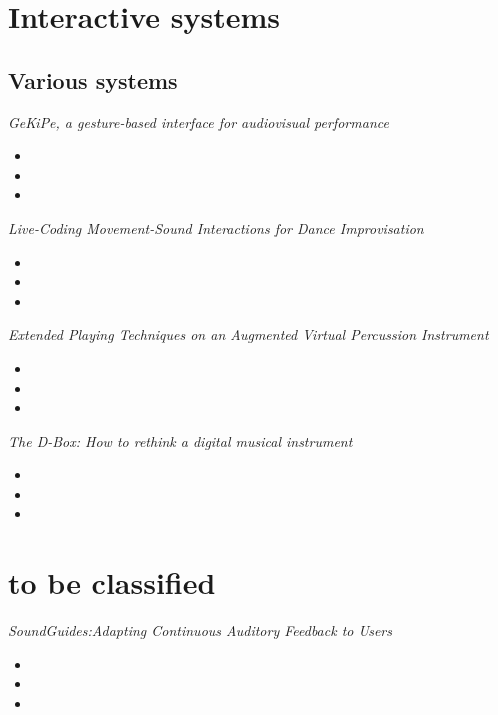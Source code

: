 \documentclass[11pt]{article}
\begin{document}
\section{Interactive systems}

\subsection{Various systems}

\textit{GeKiPe, a gesture-based interface for audiovisual performance} \citep{gekipe} 
\begin{itemize}
    \item 
    \item 
    \item 
\end{itemize}

\textit{Live-Coding Movement-Sound Interactions for Dance Improvisation} \citep{gekipe} 
\begin{itemize}
    \item 
    \item 
    \item 
\end{itemize}

\textit{Extended Playing Techniques on an Augmented Virtual Percussion Instrument} \citep{gekipe} 
\begin{itemize}
    \item 
    \item 
    \item 
\end{itemize}

\textit{The D-Box: How to rethink a digital musical instrument} \citep{gekipe} 
\begin{itemize}
    \item 
    \item 
    \item 
\end{itemize}


\section*{to be classified}
\textit{SoundGuides:Adapting Continuous Auditory Feedback to Users} \citep{francoise_soundguides_2016} 
\begin{itemize}
    \item 
    \item 
    \item 
\end{itemize}
\end{document}
